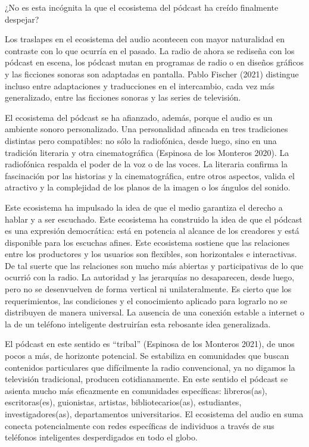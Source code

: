 \documentclass[
]{interact}
\begin{document}
¿No es esta incógnita la que el ecosistema del pódcast ha creído
finalmente despejar?

Los traslapes en el ecosistema del audio acontecen con mayor naturalidad
en contraste con lo que ocurría en el pasado. La radio de ahora se
rediseña con los pódcast en escena, los pódcast mutan en programas de
radio o en diseños gráficos y las ficciones sonoras son adaptadas en
pantalla. Pablo Fischer (2021) distingue incluso entre adaptaciones y
traducciones en el intercambio, cada vez más generalizado, entre las
ficciones sonoras y las series de televisión.

El ecosistema del pódcast se ha afianzado, además, porque el audio es un
ambiente sonoro personalizado. Una personalidad afincada en tres
tradiciones distintas pero compatibles: no sólo la radiofónica, desde
luego, sino en una tradición literaria y otra cinematográfica (Espinosa
de los Monteros 2020). La radiofónica respalda el poder de la voz o de
las voces. La literaria confirma la fascinación por las historias y la
cinematográfica, entre otros aspectos, valida el atractivo y la
complejidad de los planos de la imagen o los ángulos del sonido.

Este ecosistema ha impulsado la idea de que el medio garantiza el
derecho a hablar y a ser escuchado. Este ecosistema ha construido la
idea de que el pódcast es una expresión democrática: está en potencia al
alcance de los creadores y está disponible para los escuchas afines.
Este ecosistema sostiene que las relaciones entre los productores y los
usuarios son flexibles, son horizontales e interactivas. De tal suerte
que las relaciones son mucho más abiertas y participativas de lo que
ocurrió con la radio. La autoridad y las jerarquías no desaparecen,
desde luego, pero no se desenvuelven de forma vertical ni
unilateralmente. Es cierto que los requerimientos, las condiciones y el
conocimiento aplicado para lograrlo no se distribuyen de manera
universal. La ausencia de una conexión estable a internet o la de un
teléfono inteligente destruirían esta rebosante idea generalizada.

El pódcast en este sentido es ``tribal'' (Espinosa de los Monteros
2021), de unos pocos a más, de horizonte potencial. Se estabiliza en
comunidades que buscan contenidos particulares que difícilmente la radio
convencional, ya no digamos la televisión tradicional, producen
cotidianamente. En este sentido el pódcast se asienta mucho más
eficazmente en comunidades específicas: libreros(as), escritoras(es),
guionistas, artistas, bibliotecarios(as), estudiantes,
investigadores(as), departamentos universitarios. El ecosistema del
audio en suma conecta potencialmente con redes específicas de individuos
a través de sus teléfonos inteligentes desperdigados en todo el globo.
\end{document}
